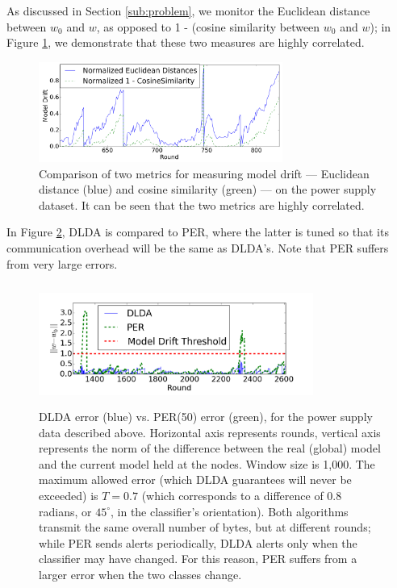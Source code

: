 As discussed in Section \ref{sub:problem}, we monitor the Euclidean distance between
$w_0$ and $w$, as opposed to 1 - (cosine similarity between $w_0$ and $w$); in 
Figure \ref{CosineVsEuclideanPowerSupply}, we demonstrate that these two
measures are highly correlated.
\begin{figure}[H]
	\centering
	\includegraphics[width=8cm]{graphics/CosineVsEuclideanPowerSupply.png}
	\caption{Comparison of two metrics for measuring model drift --- Euclidean distance (blue) and cosine similarity (green) --- on the power supply dataset. It can be seen that the two metrics are highly correlated.}
	\label{CosineVsEuclideanPowerSupply}
	\end{figure}


In Figure \ref{PERvsDLDAonPowerSupply}, 
DLDA is compared to PER, where the latter is tuned so that its
communication overhead will be the same as DLDA's. Note that
PER suffers from very large errors.

\begin{figure}
	\centering
	\includegraphics[width=9cm,height=40mm]{graphics/PERvsDLDAonPowerSupply.png}
	\caption{DLDA error (blue) vs. PER(50) error (green), for the power supply
	data described above. Horizontal axis represents rounds, vertical
	axis represents the norm of the difference between the real (global) model and the 
	current model held at the nodes. Window size is 1,000.
	The maximum allowed error (which DLDA guarantees will never be
	exceeded) is $T = 0.7$ (which corresponds to a difference of
	0.8 radians, or $45^{\circ}$, in the classifier's orientation). Both
	algorithms transmit the same overall number of bytes, but at different
	rounds; while PER sends alerts periodically, DLDA alerts only when the classifier may have changed. For this reason, PER suffers from a larger
	error when the two classes change.}
	\label{PERvsDLDAonPowerSupply}
	\end{figure}


